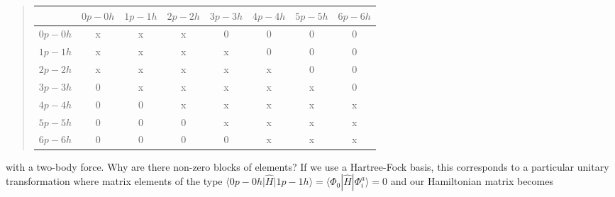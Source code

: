 \begin{quote}
\begin{tabular}{cccccccc}
\hline
\multicolumn{1}{c}{  } & \multicolumn{1}{c}{ $0p-0h$ } & \multicolumn{1}{c}{ $1p-1h$ } & \multicolumn{1}{c}{ $2p-2h$ } & \multicolumn{1}{c}{ $3p-3h$ } & \multicolumn{1}{c}{ $4p-4h$ } & \multicolumn{1}{c}{ $5p-5h$ } & \multicolumn{1}{c}{ $6p-6h$ } \\
\hline
$0p-0h$ & x       & x       & x       & 0       & 0       & 0       & 0       \\
$1p-1h$ & x       & x       & x       & x       & 0       & 0       & 0       \\
$2p-2h$ & x       & x       & x       & x       & x       & 0       & 0       \\
$3p-3h$ & 0       & x       & x       & x       & x       & x       & 0       \\
$4p-4h$ & 0       & 0       & x       & x       & x       & x       & x       \\
$5p-5h$ & 0       & 0       & 0       & x       & x       & x       & x       \\
$6p-6h$ & 0       & 0       & 0       & 0       & x       & x       & x       \\
\hline
\end{tabular}
\end{quote}

\noindent
with a two-body force. Why are there non-zero blocks of elements? 
If we use a Hartree-Fock basis, this corresponds to a particular unitary transformation where matrix elements of the type $\langle 0p-0h \vert \hat{H} \vert 1p-1h\rangle =\langle \Phi_0 | \hat{H}|\Phi_{i}^{a}\rangle=0$ and our Hamiltonian matrix becomes 


